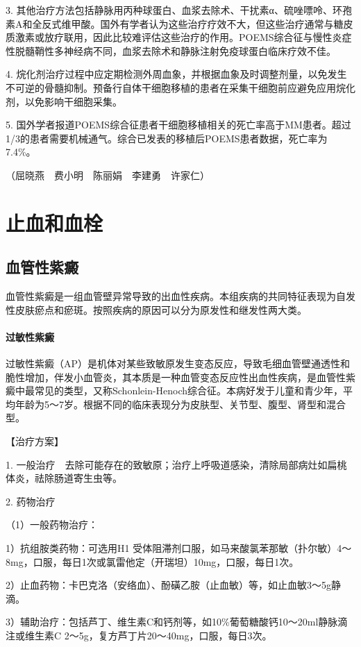 3.
其他治疗方法包括静脉用丙种球蛋白、血浆去除术、干扰素α、硫唑嘌呤、环孢素A和全反式维甲酸。国外有学者认为这些治疗疗效不大，但这些治疗通常与糖皮质激素或放疗联用，因此比较难评估这些治疗的作用。POEMS综合征与慢性炎症性脱髓鞘性多神经病不同，血浆去除术和静脉注射免疫球蛋白临床疗效不佳。

4.
烷化剂治疗过程中应定期检测外周血象，并根据血象及时调整剂量，以免发生不可逆的骨髓抑制。预备行自体干细胞移植的患者在采集干细胞前应避免应用烷化剂，以免影响干细胞采集。

5.
国外学者报道POEMS综合征患者干细胞移植相关的死亡率高于MM患者。超过1/3的患者需要机械通气。综合已发表的移植后POEMS患者数据，死亡率为7.4\%。

（屈晓燕　费小明　陈丽娟　李建勇　许家仁）

\section{止血和血栓}

\subsection{血管性紫癜}

血管性紫癜是一组血管壁异常导致的出血性疾病。本组疾病的共同特征表现为自发性皮肤瘀点和瘀斑。按照疾病的原因可以分为原发性和继发性两大类。

\paragraph{过敏性紫癜}

过敏性紫癜（AP）是机体对某些致敏原发生变态反应，导致毛细血管壁通透性和脆性增加，伴发小血管炎，其本质是一种血管变态反应性出血性疾病，是血管性紫癜中最常见的类型，又称Schonlein-Henoch综合征。本病好发于儿童和青少年，平均年龄为5～7岁。根据不同的临床表现分为皮肤型、关节型、腹型、肾型和混合型。

【治疗方案】

1.
一般治疗　去除可能存在的致敏原；治疗上呼吸道感染，清除局部病灶如扁桃体炎，祛除肠道寄生虫等。

2. 药物治疗

（1）一般药物治疗：

1）抗组胺类药物：可选用H{1}
受体阻滞剂口服，如马来酸氯苯那敏（扑尔敏）4～8mg，口服，每日1次或氯雷他定（开瑞坦）10mg，口服，每日1次。

2）止血药物：卡巴克洛（安络血）、酚磺乙胺（止血敏）等，如止血敏3～5g静滴。

3）辅助治疗：包括芦丁、维生素C和钙剂等，如10\%葡萄糖酸钙10～20ml静脉滴注或维生素C
2～5g，复方芦丁片20～40mg，口服，每日3次。

